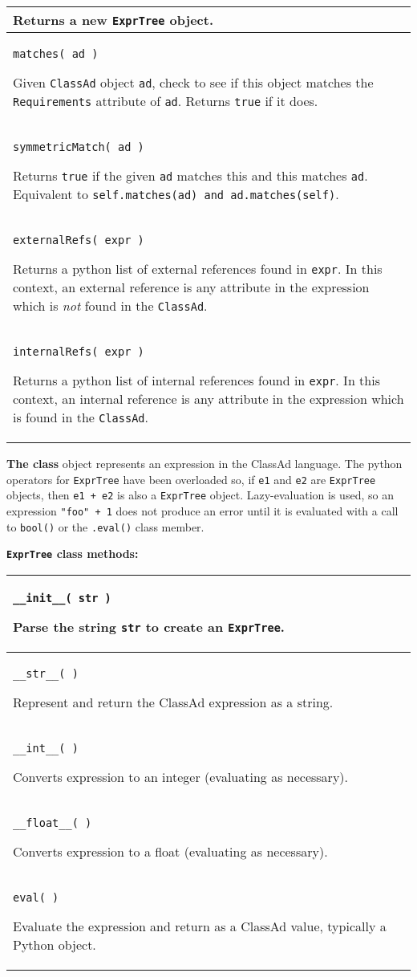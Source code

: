 \begin{flushleft}
\begin{tabular}{|p{16cm}|}
Returns a new \texttt{ExprTree} object.
\\ \hline
\texttt{matches( ad )}

Given \texttt{ClassAd} object \texttt{ad}, 
check to see if this object matches the \texttt{Requirements} attribute
of \texttt{ad}.
Returns \texttt{true} if it does.

\\ \hline
\texttt{symmetricMatch( ad )}

Returns \texttt{true} if the given \texttt{ad} matches this and this matches
\texttt{ad}.  Equivalent to \texttt{self.matches(ad) and ad.matches(self)}.

\\ \hline
\texttt{externalRefs( expr )}

Returns a python list of external references found in \texttt{expr}.  
In this context, 
an external reference is any attribute in the expression which is \emph{not}
found in the \texttt{ClassAd}.

\\ \hline
\texttt{internalRefs( expr )}

Returns a python list of internal references found in \texttt{expr}.  
In this context, 
an internal reference is any attribute in the expression which is
found in the \texttt{ClassAd}.
\\ \hline

\end{tabular}
\end{flushleft}


\textbf{The  class} object
represents an expression in the ClassAd language.  The python operators
for \texttt{ExprTree} have been overloaded so, if \texttt{e1} and \texttt{e2}
are \texttt{ExprTree} objects, then \texttt{e1 + e2} is also a \texttt{ExprTree}
object.  Lazy-evaluation is used, so an expression \texttt{"foo" + 1} does not
produce an error until it is evaluated with a call to \texttt{bool()} or the
\texttt{.eval()} class member.

\textbf{\texttt{ExprTree} class methods:}
\begin{flushleft}
\begin{tabular}{|p{16cm}|} \hline
\texttt{\_\_init\_\_( str )}

Parse the string \texttt{str} to create an \texttt{ExprTree}.
\\ \hline
\texttt{\_\_str\_\_( )}

Represent and return the ClassAd expression as a string.
\\ \hline
\texttt{\_\_int\_\_( )}

Converts expression to an integer (evaluating as necessary).
\\ \hline
\texttt{\_\_float\_\_( )}

Converts expression to a float (evaluating as necessary).
\\ \hline
\texttt{eval( )}

Evaluate the expression and return as a ClassAd value, 
typically a Python object.
\\ \hline
\end{tabular}
\end{flushleft}

